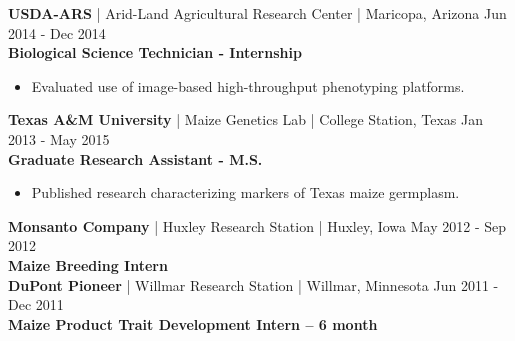 \textbf{USDA-ARS} | Arid-Land Agricultural Research Center | Maricopa, Arizona \hfill Jun 2014 - Dec 2014 \\
    \tab \textbf{Biological Science Technician - Internship} \\
    \begin{addmargin}[1cm]{2cm}
    \begin{itemize}[left=-0.2cm, itemsep=-0.15cm]
        \item Evaluated use of image-based high-throughput phenotyping platforms.
    \end{itemize}
    \end{addmargin}
        
\textbf{Texas A\&M University} | Maize Genetics Lab | College Station, Texas \hfill Jan 2013 - May 2015 \\
    \tab \textbf{Graduate Research Assistant - M.S.} \\
    \begin{addmargin}[1cm]{2cm}
    \begin{itemize}[left=-0.2cm, itemsep=-0.15cm]
        \item Published research characterizing markers of Texas maize germplasm.
    \end{itemize}
    \end{addmargin}

\textbf{Monsanto Company} | Huxley Research Station | Huxley, Iowa \hfill May 2012 - Sep 2012 \\
    \tab \textbf{Maize Breeding Intern} \\
    
\textbf{DuPont Pioneer} | Willmar Research Station | Willmar, Minnesota \hfill Jun 2011 - Dec 2011 \\
    \tab \textbf{Maize Product Trait Development Intern – 6 month} \\
    
